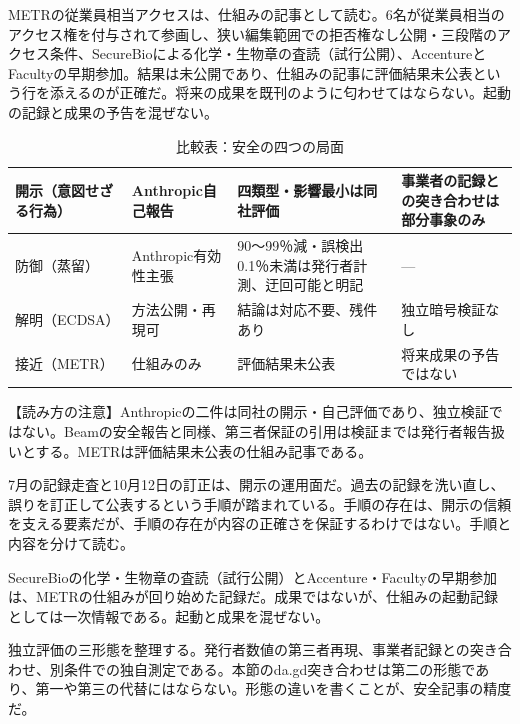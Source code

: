 \documentclass[lualatex,a4paper,10pt]{jlreq}
\begin{document}
METRの従業員相当アクセスは、仕組みの記事として読む。6名が従業員相当のアクセス権を付与されて参画し、狭い編集範囲での拒否権なし公開・三段階のアクセス条件、SecureBioによる化学・生物章の査読（試行公開）、AccentureとFacultyの早期参加。結果は未公開であり、仕組みの記事に評価結果未公表という行を添えるのが正確だ。将来の成果を既刊のように匂わせてはならない。起動の記録と成果の予告を混ぜない。
\cite{B39}


\begin{table}[htbp]\centering\footnotesize
\caption{比較表：安全の四つの局面}
\begin{tabularx}{0.96\linewidth}{@{}lXXX@{}}
\toprule
開示（意図せざる行為） & Anthropic自己報告 & 四類型・影響最小は同社評価 & 事業者の記録との突き合わせは部分事象のみ \\
\midrule
防御（蒸留） & Anthropic有効性主張 & 90〜99％減・誤検出0.1％未満は発行者計測、迂回可能と明記 & --- \\
\midrule
解明（ECDSA） & 方法公開・再現可 & 結論は対応不要、残件あり & 独立暗号検証なし \\
\midrule
接近（METR） & 仕組みのみ & 評価結果未公表 & 将来成果の予告ではない \\
\bottomrule
\end{tabularx}
\end{table}
\cite{B39,B40,B41,B42}


\begin{tcolorbox}[colback=SurveySoft,colframe=SurveyRule,arc=1mm,boxrule=0.4pt,left=2mm,right=2mm]
【読み方の注意】Anthropicの二件は同社の開示・自己評価であり、独立検証ではない。Beamの安全報告と同様、第三者保証の引用は検証までは発行者報告扱いとする。METRは評価結果未公表の仕組み記事である。
\end{tcolorbox}
\cite{B39,B40,B41,B42}


7月の記録走査と10月12日の訂正は、開示の運用面だ。過去の記録を洗い直し、誤りを訂正して公表するという手順が踏まれている。手順の存在は、開示の信頼を支える要素だが、手順の存在が内容の正確さを保証するわけではない。手順と内容を分けて読む。
\cite{B40}


SecureBioの化学・生物章の査読（試行公開）とAccenture・Facultyの早期参加は、METRの仕組みが回り始めた記録だ。成果ではないが、仕組みの起動記録としては一次情報である。起動と成果を混ぜない。
\cite{B39}


独立評価の三形態を整理する。発行者数値の第三者再現、事業者記録との突き合わせ、別条件での独自測定である。本節のda.gd突き合わせは第二の形態であり、第一や第三の代替にはならない。形態の違いを書くことが、安全記事の精度だ。
\cite{B40}
\end{document}
